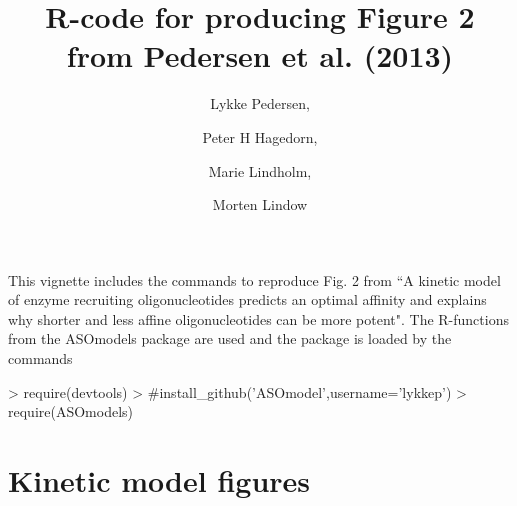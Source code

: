 \documentclass{article}
\title{R-code for producing Figure 2 from Pedersen et al. (2013)}
\author{Lykke Pedersen, \and Peter H Hagedorn, \and Marie Lindholm, \and Morten Lindow}
\date{}
\begin{document}



\maketitle
This vignette includes the commands to reproduce Fig. 2 from ``A kinetic model of enzyme recruiting oligonucleotides predicts an optimal affinity and explains why shorter and less affine oligonucleotides can be more potent". The R-functions from the ASOmodels package are used and the package is loaded by the commands

\begin{Schunk}
\begin{Sinput}
> require(devtools)
> #install_github('ASOmodel',username='lykkep')
> require(ASOmodels)
\end{Sinput}
\end{Schunk}

\section*{Kinetic model figures}
\end{document}
